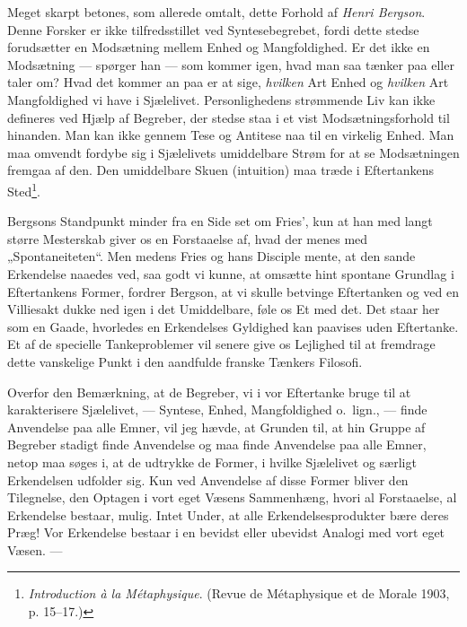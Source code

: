 \documentclass[12pt,a4paper]{book}
\newcommand{\apage}[1]{\marginnote{\footnotesize\textit{[#1]}}}
\begin{document}
Meget skarpt betones, som allerede omtalt, dette Forhold af \emph{Henri
Bergson}. Denne Forsker er ikke tilfredsstillet ved Syntesebegrebet,
fordi dette stedse forudsætter en Modsætning mellem Enhed og
Mangfoldighed. Er det ikke en \apage{17} Modsætning --- spørger han --- som
kommer igen, hvad man saa tænker paa eller taler om? Hvad det kommer
an paa er at sige, \emph{hvilken} Art Enhed og \emph{hvilken} Art
Mangfoldighed vi have i Sjælelivet. Personlighedens strømmende Liv kan
ikke defineres ved Hjælp af Begreber, der stedse staa i et vist
Modsætningsforhold til hinanden. Man kan ikke gennem Tese og Antitese
naa til en virkelig Enhed. Man maa omvendt fordybe sig i Sjælelivets
umiddelbare Strøm for at se Modsætningen fremgaa af den. Den
umiddelbare Skuen (intuition) maa træde i Eftertankens
Sted\footnote{\emph{Introduction à la Métaphysique}. (Revue de
Métaphysique et de Morale 1903, p. 15--17.)}.

Bergsons Standpunkt minder fra en Side set om Fries’, kun at han med
langt større Mesterskab giver os en Forstaaelse af, hvad der menes med
„Spontaneiteten“. Men medens Fries og hans Disciple mente, at den
sande Erkendelse naaedes ved, saa godt vi kunne, at omsætte hint
spontane Grundlag i Eftertankens Former, fordrer Bergson, at vi skulle
betvinge Eftertanken og ved en Villiesakt dukke ned igen i det
Umiddelbare, føle os Et med det. Det staar her som en Gaade, hvorledes
en Erkendelses Gyldighed kan paavises uden Eftertanke. Et af de
specielle Tankeproblemer vil senere give os Lejlighed til at fremdrage
dette vanskelige Punkt i den aandfulde franske Tænkers Filosofi.

Overfor den Bemærkning, at de Begreber, vi i vor Eftertanke bruge til
at karakterisere Sjælelivet, --- Syntese, Enhed, Mangfoldighed
o.\ lign., --- finde Anvendelse paa alle Emner, vil jeg hævde, at
Grunden til, at hin Gruppe af Begreber stadigt finde Anvendelse og maa
finde Anvendelse paa alle Emner, netop maa søges i, at de udtrykke de
Former, i hvilke Sjælelivet og særligt Erkendelsen udfolder sig. Kun
ved Anvendelse af disse Former bliver den Tilegnelse, den Optagen i
vort eget Væsens Sammenhæng, hvori al Forstaaelse, al Erkendelse
bestaar, mulig. Intet Under, at alle Erkendelsesprodukter bære deres
Præg! Vor Erkendelse bestaar i en bevidst eller ubevidst Analogi med
vort eget Væsen. ---
\end{document}
